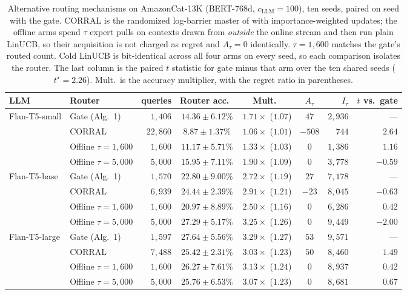 \documentclass{article}
\theoremstyle{definition}
\theoremstyle{remark}
\theoremstyle{remark}
\begin{document}
\begin{table}[h]
\centering
\caption{Alternative routing mechanisms on AmazonCat-13K (BERT-768d,
$c_{\mathrm{LLM}}=100$), ten seeds, paired on seed with the gate. CORRAL is the randomized
log-barrier master of \cite{agarwal2017corralling} with importance-weighted
updates; the offline arms spend $\tau$ expert pulls on contexts drawn from
\emph{outside} the online stream and then run plain LinUCB, so their
acquisition is not charged as regret and $A_\tau=0$ identically.
$\tau=1{,}600$ matches the gate's routed count. Cold LinUCB is bit-identical
across all four arms on every seed, so each comparison isolates the router.
The last column is the paired $t$ statistic for gate minus that arm over the
ten shared seeds ($t^\star=2.26$). Mult.\ is the accuracy multiplier, with
the regret ratio in parentheses.}
\label{tab:baselines}
\small
\setlength{\tabcolsep}{4pt}
\begin{tabular}{@{}llrcccrr@{}}
\toprule
LLM & Router & queries & Router acc.\ & Mult.\ & $A_\tau$ & $I_\tau$ & $t$ vs.\ gate \\
\midrule
\multirow{4}{*}{Flan-T5-small}
 & Gate (Alg.\ 1)    & $1{,}406$  & $14.36\pm6.12\%$ & $1.71\times$ ($1.07$) & $47$   & $2{,}936$ & --- \\
 & CORRAL            & $22{,}860$ & $8.87\pm1.37\%$  & $1.06\times$ ($1.01$) & $-508$ & $744$     & $\mathbf{2.64}$ \\
 & Offline $\tau{=}1{,}600$ & $1{,}600$ & $11.17\pm5.71\%$ & $1.33\times$ ($1.03$) & $0$ & $1{,}386$ & $1.16$ \\
 & Offline $\tau{=}5{,}000$ & $5{,}000$ & $15.95\pm7.11\%$ & $1.90\times$ ($1.09$) & $0$ & $3{,}778$ & $-0.59$ \\
\midrule
\multirow{4}{*}{Flan-T5-base}
 & Gate (Alg.\ 1)    & $1{,}570$ & $22.80\pm9.00\%$ & $2.72\times$ ($1.19$) & $27$  & $7{,}178$ & --- \\
 & CORRAL            & $6{,}939$ & $24.44\pm2.39\%$ & $2.91\times$ ($1.21$) & $-23$ & $8{,}045$ & $-0.63$ \\
 & Offline $\tau{=}1{,}600$ & $1{,}600$ & $20.97\pm8.89\%$ & $2.50\times$ ($1.16$) & $0$ & $6{,}286$ & $0.42$ \\
 & Offline $\tau{=}5{,}000$ & $5{,}000$ & $27.29\pm5.17\%$ & $3.25\times$ ($1.26$) & $0$ & $9{,}449$ & $-2.00$ \\
\midrule
\multirow{4}{*}{Flan-T5-large}
 & Gate (Alg.\ 1)    & $1{,}597$ & $27.64\pm5.56\%$ & $3.29\times$ ($1.27$) & $53$ & $9{,}571$ & --- \\
 & CORRAL            & $7{,}488$ & $25.42\pm2.31\%$ & $3.03\times$ ($1.23$) & $50$ & $8{,}460$ & $1.49$ \\
 & Offline $\tau{=}1{,}600$ & $1{,}600$ & $26.27\pm7.61\%$ & $3.13\times$ ($1.24$) & $0$ & $8{,}937$ & $0.42$ \\
 & Offline $\tau{=}5{,}000$ & $5{,}000$ & $25.76\pm6.53\%$ & $3.07\times$ ($1.23$) & $0$ & $8{,}681$ & $0.67$ \\
\bottomrule
\end{tabular}
\end{table}
\end{document}
